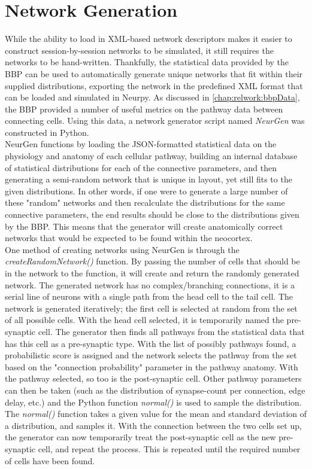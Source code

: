\section{Network Generation}

While the ability to load in XML-based network descriptors makes it easier to construct session-by-session networks to be simulated, it still requires the networks to be hand-written. Thankfully, the statistical data provided by the BBP can be used to automatically generate unique networks that fit within their supplied distributions, exporting the network in the predefined XML format that can be loaded and simulated in Neurpy. As discussed in \ref{chap:relwork:bbpData}, the BBP provided a number of useful metrics on the pathway data between connecting cells. Using this data, a network generator script named \emph{NeurGen} was constructed in Python. \\
NeurGen functions by loading the JSON-formatted statistical data on the physiology and anatomy of each cellular pathway, building an internal database of statistical distributions for each of the connective parameters, and then generating a semi-random network that is unique in layout, yet still fits to the given distributions. In other words, if one were to generate a large number of these "random" networks and then recalculate the distributions for the same connective parameters, the end results should be close to the distributions given by the BBP. This means that the generator will create anatomically correct networks that would be expected to be found within the neocortex.\\
One method of creating networks using NeurGen is through the \emph{createRandomNetwork()} function. By passing the number of cells that should be in the network to the function, it will create and return the randomly generated network. The generated network has no complex/branching connections, it is a serial line of neurons with a single path from the head cell to the tail cell. The network is generated iteratively; the first cell is selected at random from the set of all possible cells. With the head cell selected, it is temporarily named the pre-synaptic cell. The generator then finds all pathways from the statistical data that has this cell as a pre-synaptic type. With the list of possibly pathways found, a probabilistic score is assigned and the network selects the pathway from the set based on the "connection probability" parameter in the pathway anatomy. With the pathway selected, so too is the post-synaptic cell. Other pathway parameters can then be taken (such as the distribution of synapse-count per connection, edge delay, etc.) and the Python function \emph{normal()} is used to sample the distribution. The \emph{normal()} function takes a given value for the mean and standard deviation of a distribution, and samples it. With the connection between the two cells set up, the generator can now temporarily treat the post-synaptic cell as the new pre-synaptic cell, and repeat the process. This is repeated until the required number of cells have been found.\\
